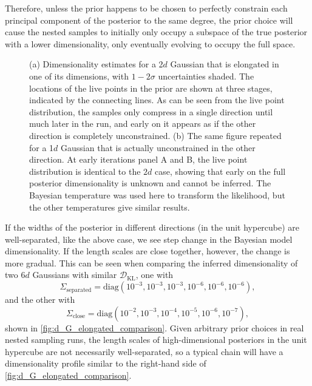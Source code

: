 \documentclass[usenatbib]{mnras}
\newcommand{\DKL}{\mathcal{D}_\mathrm{KL}}
\begin{document}
\par
Therefore, unless the prior happens to be chosen to perfectly constrain each principal component of the posterior to the same degree, the prior choice will cause the nested samples to initially only occupy a subspace of the true posterior with a lower dimensionality, only eventually evolving to occupy the full space.
\begin{figure*}
\begin{center}
\end{center}
\caption{(a) Dimensionality estimates for a 2$d$ Gaussian that is elongated in one of its dimensions, with $1-2\sigma$ uncertainties shaded. The locations of the live points in the prior are shown at three stages, indicated by the connecting lines. As can be seen from the live point distribution, the samples only compress in a single direction until much later in the run, and early on it appears as if the other direction is completely unconstrained. (b) The same figure repeated for a 1$d$ Gaussian that is actually unconstrained in the other direction. At early iterations panel A and B, the live point distribution is identical to the $2d$ case, showing that early on the full posterior dimensionality is unknown and cannot be inferred. The Bayesian temperature was used here to transform the likelihood, but the other temperatures give similar results.}
\label{fig:d_G_elongated}
\end{figure*}
\par
If the widths of the posterior in different directions (in the unit hypercube) are well-separated, like the above case, we see step change in the Bayesian model dimensionality. If the length scales are close together, however, the change is more gradual. This can be seen when comparing the inferred dimensionality of two $6d$ Gaussians with similar $\DKL$, one with 
\begin{equation}\label{eq:elongated_separated}
    \Sigma_\mathrm{separated} = \mathrm{diag}(10^{-3}, 10^{-3}, 10^{-3}, 10^{-6}, 10^{-6}, 10^{-6}),
\end{equation}
and the other with 
\begin{equation}\label{eq:elongated_close}
    \Sigma_\mathrm{close} = \mathrm{diag}(10^{-2}, 10^{-3}, 10^{-4}, 10^{-5}, 10^{-6}, 10^{-7}),
\end{equation}
shown in \cref{fig:d_G_elongated_comparison}. Given arbitrary prior choices in real nested sampling runs, the length scales of high-dimensional posteriors in the unit hypercube are not necessarily well-separated, so a typical chain will have a dimensionality profile similar to the right-hand side of \cref{fig:d_G_elongated_comparison}.
\end{document}

